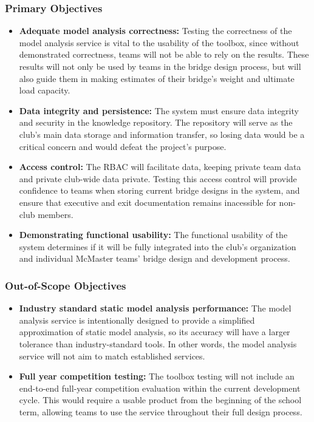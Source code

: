 \documentclass[12pt, titlepage]{article}
\begin{document}
\subsubsection{Primary Objectives}
\begin{itemize}

  \item \textbf{Adequate model analysis correctness:} Testing the correctness of the model analysis service is vital to the usability of the toolbox, since without 
  demonstrated correctness, teams will not be able to rely on the results. These results will not only be used by teams in the bridge design process, but will also 
  guide them in making estimates of their bridge's weight and ultimate load capacity.
  
  \item \textbf{Data integrity and persistence:} The system must ensure data integrity and security in the knowledge repository. The repository will 
  serve as the club's main data storage and information transfer, so losing data would be a critical concern and would defeat the project's purpose.
  
  \item \textbf{Access control:} The RBAC will facilitate data, keeping private team data and private club-wide data private. Testing 
  this access control will provide confidence to teams when storing current bridge designs in the system, and ensure that executive and exit documentation remains inacessible for non-club members. 
  
  \item \textbf{Demonstrating functional usability:} The functional usability of the system determines if it will be fully integrated into the club's organization and 
  individual McMaster teams' bridge design and development process.
   
\end{itemize}

\subsubsection{Out-of-Scope Objectives}
\begin{itemize}
  
  \item \textbf{Industry standard static model analysis performance:} The model analysis service is intentionally designed to provide a simplified approximation of static model 
  analysis, so its accuracy will have a larger tolerance than industry-standard tools. In other words, the model analysis service will not aim to match established services.

  \item \textbf{Full year competition testing:} The toolbox testing will not include an end-to-end full-year competition evaluation within the current development cycle. This would require a usable product 
  from the beginning of the school term, allowing teams to use the service throughout their full design process.
\end{itemize}
\end{document}
